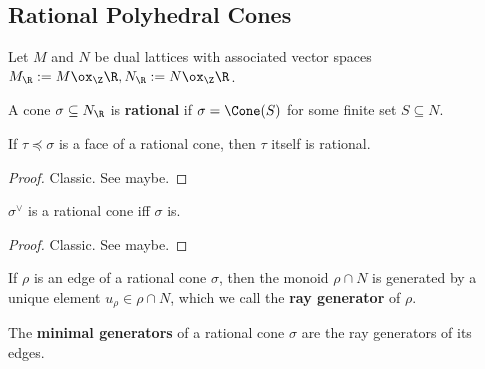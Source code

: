 \subsection{Rational Polyhedral Cones}


Let $M$ and $N$ be dual lattices with associated vector spaces $M_\R := M \ox_\Z \R, N_\R := N \ox_\Z \R$.


\begin{definition}
  \label{1-2-14-rat-cone}

  A cone $\sigma \subseteq N_\R$ is {\bf rational} if $\sigma = \Cone(S)$ for some finite set $S \subseteq N$.
\end{definition}


\begin{lemma}
  \label{1-2-14-face-rat-cone}

  If $\tau \preceq \sigma$ is a face of a rational cone, then $\tau$ itself is rational.
\end{lemma}
\begin{proof}
  \uses{}

  Classic. See \cite{Oda_1988} maybe.
\end{proof}


\begin{lemma}
  \label{1-2-14-dual-rat-cone}

  $\sigma^\vee$ is a rational cone iff $\sigma$ is.
\end{lemma}
\begin{proof}
  \uses{}

  Classic. See \cite{Oda_1988} maybe.
\end{proof}


\begin{definition}
  \label{1-2-ray-gen}

  If $\rho$ is an edge of a rational cone $\sigma$, then the monoid $\rho \cap N$ is generated by a unique element $u_\rho \in \rho \cap N$, which we call the {\bf ray generator} of $\rho$.
\end{definition}


\begin{definition}
  \label{1-2-min-gen}

  The {\bf minimal generators} of a rational cone $\sigma$ are the ray generators of its edges.
\end{definition}


